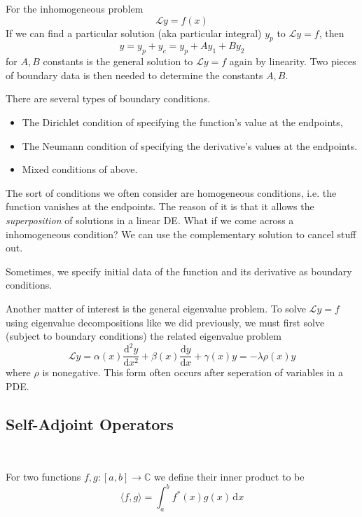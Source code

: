 \documentclass[a4paper]{article}
\begin{document}
For the inhomogeneous problem 
\begin{equation}
    \mathcal Ly=f(x)
\end{equation}
If we can find a particular solution (aka particular integral) $y_p$ to $\mathcal Ly=f$, then
\begin{equation}
    y=y_p+y_c=y_p+Ay_1+By_2
\end{equation}
for $A,B$ constants is the general solution to $\mathcal Ly=f$ again by linearity.
Two pieces of boundary data is then needed to determine the constants $A,B$.

There are several types of boundary conditions.
\begin{itemize}
    \item The Dirichlet condition of specifying the function's value at the endpoints, \item The Neumann condition of specifying the derivative's values at the endpoints.
    \item Mixed conditions of above.
\end{itemize}

The sort of conditions we often consider are homogeneous conditions, i.e. the function vanishes at the endpoints.
The reason of it is that it allows the \textit{superposition} of solutions in a linear DE.
What if we come across a inhomogeneous condition?
We can use the complementary solution to cancel stuff out.

Sometimes, we specify initial data of the function and its derivative as boundary conditions.

Another matter of interest is the general eigenvalue problem.
To solve $\mathcal Ly=f$ using eigenvalue decompositions like we did previously, we must first solve (subject to boundary conditions) the related eigenvalue problem
\begin{equation}
    \mathcal Ly=\alpha(x)\frac{\mathrm d^2y}{\mathrm dx^2}+\beta(x)\frac{\mathrm dy}{\mathrm dx}+\gamma(x)y=-\lambda\rho(x)y
\end{equation}
where $\rho$ is nonegative.
This form often occurs after seperation of variables in a PDE.
\subsection{Self-Adjoint Operators}\ \vspace{-1.5em}
\begin{definition}
    For two functions $f,g:[a,b]\to\mathbb C$ we define their inner product to be
    $$\langle f,g\rangle=\int_a^bf^*(x)g(x)\,\mathrm dx$$
\end{definition}
\end{document}
